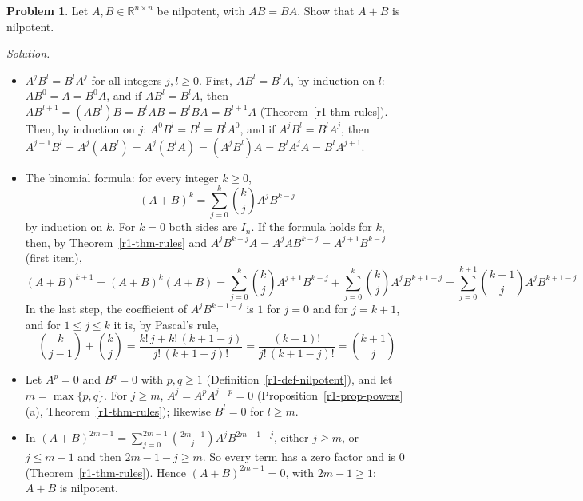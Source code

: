 \documentclass[12pt]{article}
\newcommand{\R}{\mathbb R}
\theoremstyle{definition}
\newtheorem{problem}{Problem}
\newenvironment{solution}{\par\noindent\textit{Solution.}\ }{\par\smallskip}
\begin{document}
\begin{problem}\label{r1-ex-pr-nilpotent-sum}
Let \(A,B\in\R^{n\times n}\) be nilpotent, with \(AB=BA\). Show that \(A+B\) is nilpotent.
\end{problem}
\begin{solution}
\begin{itemize}
\item \(A^jB^l=B^lA^j\) for all integers \(j,l\geqslant0\). First, \(AB^l=B^lA\), by induction on \(l\):
\(AB^0=A=B^0A\), and if \(AB^l=B^lA\), then \(AB^{l+1}=(AB^l)B=B^lAB=B^lBA=B^{l+1}A\) (Theorem~\ref{r1-thm-rules}).
Then, by induction on \(j\): \(A^0B^l=B^l=B^lA^0\), and if \(A^jB^l=B^lA^j\), then
\(A^{j+1}B^l=A^j(AB^l)=A^j(B^lA)=(A^jB^l)A=B^lA^jA=B^lA^{j+1}\).
\item The binomial formula: for every integer \(k\geqslant0\),
\[
(A+B)^k=\sum_{j=0}^k\binom kjA^jB^{k-j}
\]
by induction on \(k\). For \(k=0\) both sides are \(I_n\). If the formula holds for \(k\), then, by
Theorem~\ref{r1-thm-rules} and \(A^jB^{k-j}A=A^jAB^{k-j}=A^{j+1}B^{k-j}\) (first item),
\[
(A+B)^{k+1}=(A+B)^k(A+B)=\sum_{j=0}^k\binom kjA^{j+1}B^{k-j}+\sum_{j=0}^k\binom kjA^jB^{k+1-j}
=\sum_{j=0}^{k+1}\binom{k+1}jA^jB^{k+1-j}
\]
In the last step, the coefficient of \(A^jB^{k+1-j}\) is \(1\) for \(j=0\) and for \(j=k+1\), and for
\(1\leqslant j\leqslant k\) it is, by Pascal's rule,
\[
\binom k{j-1}+\binom kj=\frac{k!\,j+k!\,(k+1-j)}{j!\,(k+1-j)!}=\frac{(k+1)!}{j!\,(k+1-j)!}=\binom{k+1}j
\]
\item Let \(A^p=0\) and \(B^q=0\) with \(p,q\geqslant1\) (Definition~\ref{r1-def-nilpotent}), and let \(m=\max\{p,q\}\).
For \(j\geqslant m\), \(A^j=A^pA^{j-p}=0\) (Proposition~\ref{r1-prop-powers}(a), Theorem~\ref{r1-thm-rules}); likewise
\(B^l=0\) for \(l\geqslant m\).
\item In \((A+B)^{2m-1}=\sum_{j=0}^{2m-1}\binom{2m-1}jA^jB^{2m-1-j}\), either \(j\geqslant m\), or \(j\leqslant m-1\)
and then \(2m-1-j\geqslant m\). So every term has a zero factor and is \(0\) (Theorem~\ref{r1-thm-rules}). Hence
\((A+B)^{2m-1}=0\), with \(2m-1\geqslant1\): \(A+B\) is nilpotent.
\end{itemize}
\end{solution}
\end{document}

